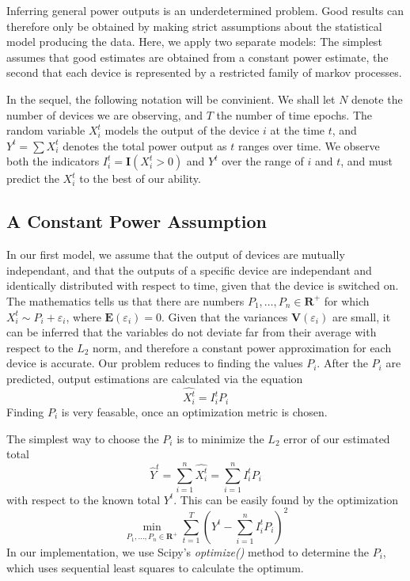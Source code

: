 \documentclass{article}
\begin{document}
Inferring general power outputs is an underdetermined problem. Good results can therefore only be obtained by making strict assumptions about the statistical model producing the data. Here, we apply two separate models: The simplest assumes that good estimates are obtained from a constant power estimate, the second that each device is represented by a restricted family of markov processes.

In the sequel, the following notation will be convinient. We shall let $N$ denote the number of devices we are observing, and $T$ the number of time epochs. The random variable $X_i^t$ models the output of the device $i$ at the time $t$, and $Y^t = \sum X_i^t$ denotes the total power output as $t$ ranges over time. We observe both the indicators $I_i^t = \mathbf{I}(X_i^t > 0)$ and $Y^t$ over the range of $i$ and $t$, and must predict the $X_i^t$ to the best of our ability.

\subsection{A Constant Power Assumption}

In our first model, we assume that the output of devices are mutually independant, and that the outputs of a specific device are independant and identically distributed with respect to time, given that the device is switched on. The mathematics tells us that there are numbers $P_1, \dots, P_n \in \mathbf{R}^+$ for which $X_i^t \sim P_i + \varepsilon_i$, where $\mathbf{E}(\varepsilon_i) = 0$. Given that the variances $\mathbf{V}(\varepsilon_i)$ are small, it can be inferred that the variables do not deviate far from their average with respect to the $L_2$ norm, and therefore a constant power approximation for each device is accurate. Our problem reduces to finding the values $P_i$. After the $P_i$ are predicted, output estimations are calculated via the equation
%
\[ \hat{X_i^t} = I_i^t P_i \]
%
Finding $P_i$ is very feasable, once an optimization metric is chosen.

The simplest way to choose the $P_i$ is to minimize the $L_2$ error of our estimated total
%
\[ \hat{Y}^t = \sum_{i = 1}^n \hat{X_i^t} = \sum_{i = 1}^n I_i^t P_i \]
%
with respect to the known total $Y^t$. This can be easily found by the optimization
%
\[ \min_{P_1, \dots, P_n \in \mathbf{R}^+} \sum_{t = 1}^T \left( Y^t - \sum_{i = 1}^n I_i^t P_i \right)^2 \]
%
In our implementation, we use Scipy's {\it optimize()} method to determine the $P_i$, which uses sequential least squares to calculate the optimum.
\end{document}
